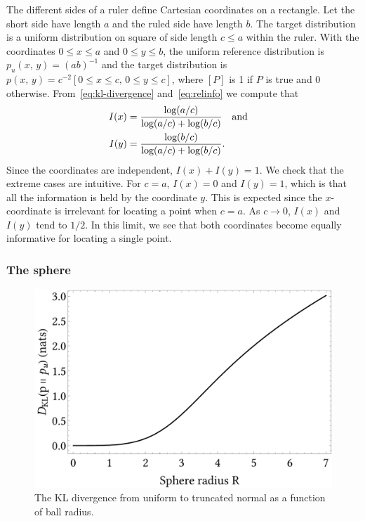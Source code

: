 \documentclass[aps,reprint,floatfix]{revtex4-2}
\renewcommand\mathrm\textnormal%
\theoremstyle{plain}
\theoremstyle{definition}
\renewcommand\leq\leqslant%
\renewcommand\log{\operatorname{\mathrm{log}}}
\begin{document}
The different sides of a ruler define Cartesian coordinates on a rectangle. Let
the short side have length $a$ and the ruled side have length $b$. The target
distribution is a uniform distribution on square of side length $c \leq a$
within the ruler. With the coordinates $0 \leq x \leq a$ and $0 \leq y \leq b$,
the uniform reference distribution is $p_u(x,\, y) = {(ab)}^{-1}$ and the target
distribution is $p(x,\, y) = c^{-2} [0 \leq x \leq c,\, 0 \leq y \leq c]$, where
$[P]$ is 1 if $P$ is true and $0$ otherwise. From~\eqref{eq:kl-divergence}
and~\eqref{eq:relinfo} we compute that
\begin{align}
  I(x)
  &= \frac{\log(a/c)}{\log(a/c) + \log(b/c)} \qand \\
  I(y)
  &= \frac{\log(b/c)}{\log(a/c) + \log(b/c)}.
\end{align}
Since the coordinates are independent, $I(x) + I(y) = 1$. We check that the
extreme cases are intuitive. For $c = a$, $I(x) = 0$ and $I(y) = 1$, which is
that all the information is held by the coordinate $y$. This is expected since
the $x$-coordinate is irrelevant for locating a point when $c = a$. As $c \to
0$, $I(x)$ and $I(y)$ tend to $1/2$. In this limit, we see that both coordinates
become equally informative for locating a single point.

\subsubsection{The sphere}

\begin{figure}
  \centering
  \includegraphics[width=0.8\linewidth]{trunc-norm-ball-kldiv}
  \caption{The KL divergence from uniform to truncated normal as a function of
  ball radius.}\label{fig:trunc-norm-ball-kldiv}
\end{figure}
\end{document}

